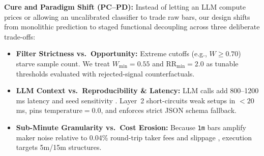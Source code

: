\documentclass[conference]{IEEEtran}
\begin{document}
\textbf{Cure and Paradigm Shift (PC--PD):} Instead of letting an LLM compute prices or allowing an uncalibrated classifier to trade raw bars, our design shifts from monolithic prediction to staged functional decoupling across three deliberate trade-offs:
\begin{itemize}
    \item \textbf{Filter Strictness vs.\ Opportunity:} Extreme cutoffs (e.g., $W \ge 0.70$) starve sample count. We treat $W_{\min}=0.55$ and $\mathrm{RR}_{\min}=2.0$ as tunable thresholds evaluated with rejected-signal counterfactuals.
    \item \textbf{LLM Context vs.\ Reproducibility \& Latency:} LLM calls add 800--1200\,ms latency and seed sensitivity \cite{koviazin2026}. Layer~2 short-circuits weak setups in $<20$\,ms, pins $\text{temperature}=0.0$, and enforces strict JSON schema fallback.
    \item \textbf{Sub-Minute Granularity vs.\ Cost Erosion:} Because \texttt{1m} bars amplify maker noise relative to 0.04\% round-trip taker fees and slippage \cite{almeida2023}, execution targets 5m/15m structures.
\end{itemize}

\end{document}
